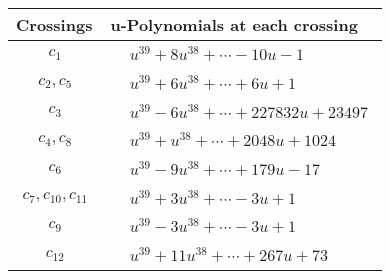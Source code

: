 \documentclass[1p]{elsarticle_modified}
\theoremstyle{definition}
\begin{document}
\begin{tabular}{m{50pt}|m{274pt}}
Crossings & \hspace{64pt}u-Polynomials at each crossing \\
\hline $$\begin{aligned}c_{1}\end{aligned}$$&$\begin{aligned}
&u^{39}+8 u^{38}+\cdots-10 u-1
\end{aligned}$\\
\hline $$\begin{aligned}c_{2},c_{5}\end{aligned}$$&$\begin{aligned}
&u^{39}+6 u^{38}+\cdots+6 u+1
\end{aligned}$\\
\hline $$\begin{aligned}c_{3}\end{aligned}$$&$\begin{aligned}
&u^{39}-6 u^{38}+\cdots+227832 u+23497
\end{aligned}$\\
\hline $$\begin{aligned}c_{4},c_{8}\end{aligned}$$&$\begin{aligned}
&u^{39}+u^{38}+\cdots+2048 u+1024
\end{aligned}$\\
\hline $$\begin{aligned}c_{6}\end{aligned}$$&$\begin{aligned}
&u^{39}-9 u^{38}+\cdots+179 u-17
\end{aligned}$\\
\hline $$\begin{aligned}c_{7},c_{10},c_{11}\end{aligned}$$&$\begin{aligned}
&u^{39}+3 u^{38}+\cdots-3 u+1
\end{aligned}$\\
\hline $$\begin{aligned}c_{9}\end{aligned}$$&$\begin{aligned}
&u^{39}-3 u^{38}+\cdots-3 u+1
\end{aligned}$\\
\hline $$\begin{aligned}c_{12}\end{aligned}$$&$\begin{aligned}
&u^{39}+11 u^{38}+\cdots+267 u+73
\end{aligned}$\\
\hline
\end{tabular}\\~\\
\end{document}
